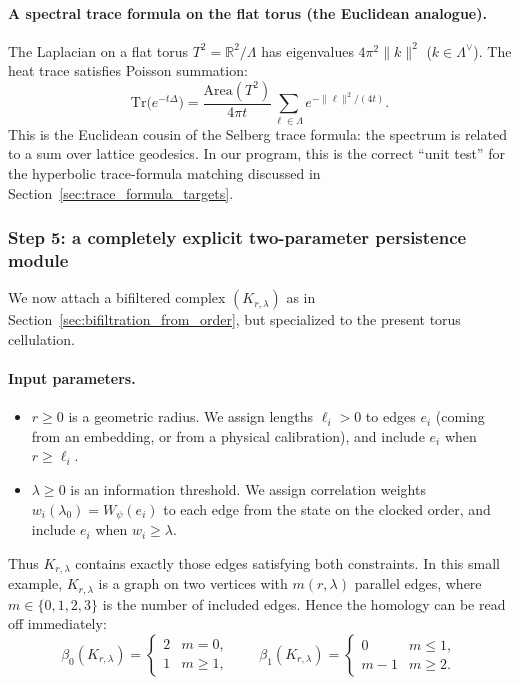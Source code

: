 \documentclass[11pt,oneside]{amsbook}
\numberwithin{equation}{section}
\theoremstyle{plain}
\theoremstyle{definition}
\theoremstyle{remark}
\newcommand{\R}{\mathbb{R}}
\begin{document}
\paragraph{A spectral trace formula on the flat torus (the Euclidean analogue).}
The Laplacian on a flat torus $T^2=\R^2/\Lambda$ has eigenvalues $4\pi^2\|k\|^2$ ($k\in\Lambda^\vee$).
The heat trace satisfies Poisson summation:
\[
\mathrm{Tr}\big(e^{-t\Delta}\big)=\frac{\mathrm{Area}(T^2)}{4\pi t}\sum_{\ell\in\Lambda}e^{-\|\ell\|^2/(4t)}.
\]
This is the Euclidean cousin of the Selberg trace formula: the spectrum is related to a sum over lattice geodesics.
In our program, this is the correct ``unit test'' for the hyperbolic trace-formula matching discussed in Section~\ref{sec:trace_formula_targets}.

\subsubsection{Step 5: a completely explicit two-parameter persistence module}

We now attach a bifiltered complex $(K_{r,\lambda})$ as in Section~\ref{sec:bifiltration_from_order}, but specialized to the present torus cellulation.

\paragraph{Input parameters.}
\begin{itemize}
\item $r\ge 0$ is a geometric radius.
We assign lengths $\ell_i>0$ to edges $e_i$ (coming from an embedding, or from a physical calibration), and include $e_i$ when $r\ge \ell_i$.
\item $\lambda\ge 0$ is an information threshold.
We assign correlation weights $w_i(\lambda_0)=W_\psi(e_i)$ to each edge from the state on the clocked order, and include $e_i$ when $w_i\ge \lambda$.
\end{itemize}

Thus $K_{r,\lambda}$ contains exactly those edges satisfying both constraints.
In this small example, $K_{r,\lambda}$ is a graph on two vertices with $m(r,\lambda)$ parallel edges, where $m\in\{0,1,2,3\}$ is the number of included edges.
Hence the homology can be read off immediately:
\[
\beta_0(K_{r,\lambda})=
\begin{cases}
2 & m=0,\\
1 & m\ge 1,
\end{cases}
\qquad
\beta_1(K_{r,\lambda})=
\begin{cases}
0 & m\le 1,\\
m-1 & m\ge 2.
\end{cases}
\]
\end{document}
